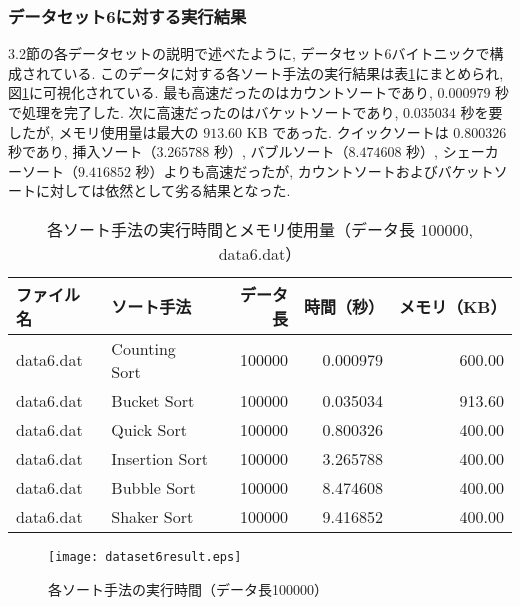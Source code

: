 \documentclass[a4j, 11pt]{jarticle}
\begin{document}
\subsubsection{データセット6に対する実行結果}
3.2節の各データセットの説明で述べたように, データセット6バイトニックで構成されている. このデータに対する各ソート手法の実行結果は表\ref{dataset6allresult}にまとめられ, 図\ref{dataset6allresultgraph}に可視化されている. 最も高速だったのはカウントソートであり, $0.000979$ 秒で処理を完了した. 次に高速だったのはバケットソートであり, $0.035034$ 秒を要したが, メモリ使用量は最大の $913.60$ KB であった. クイックソートは $0.800326$ 秒であり, 挿入ソート（$3.265788$ 秒）, バブルソート（$8.474608$ 秒）, シェーカーソート（$9.416852$ 秒）よりも高速だったが, カウントソートおよびバケットソートに対しては依然として劣る結果となった. 
\begin{table}[H]
  \centering
  \caption{各ソート手法の実行時間とメモリ使用量（データ長 100000, data6.dat）}\label{dataset6allresult}
  \begin{tabular}{|l|l|r|r|r|}
    \hline
    \textbf{ファイル名} & \textbf{ソート手法} & \textbf{データ長} & \textbf{時間（秒）} & \textbf{メモリ（KB）} \\
    \hline
    data6.dat & Counting Sort  & 100000 & 0.000979  & 600.00 \\
    data6.dat & Bucket Sort    & 100000 & 0.035034  & 913.60 \\
    data6.dat & Quick Sort     & 100000 & 0.800326  & 400.00 \\
    data6.dat & Insertion Sort & 100000 & 3.265788  & 400.00 \\
    data6.dat & Bubble Sort    & 100000 & 8.474608  & 400.00 \\
    data6.dat & Shaker Sort    & 100000 & 9.416852  & 400.00 \\
    \hline
  \end{tabular}
\end{table}
\begin{figure}[H]
  \centering
  \texttt{[image: dataset6result.eps]}
  \caption{各ソート手法の実行時間（データ長100000）}\label{dataset6allresultgraph}
\end{figure}
\end{document}
